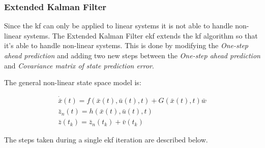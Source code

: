 \subsubsection{Extended Kalman Filter}
Since the \gls{kf} can only be applied to linear systems it is not able to handle non-linear systems. The Extended Kalman Filter {\gls{ekf}} extends the \gls{kf} algorithm so that it's able to handle non-linear systems. This is done by modifying the \textit{One-step ahead prediction} and adding two new steps between the \textit{One-step ahead prediction} and \textit{Covariance matrix of state prediction error}. 

The general non-linear state space model is:

\begin{equation}
    \begin{array}{l}
        \dot{\bar x}\left( t \right) = f\left( {\bar x\left( t \right),\bar u\left( t \right),t} \right) + G\left( {\bar x\left( t \right),t} \right)\bar w\\
        {{\bar z}_n}\left( t \right) = h\left( {\bar x\left( t \right),\bar u\left( t \right),t} \right)\\
        \bar z\left( {{t_k}} \right) = {{\bar z}_n}\left( {{t_k}} \right) + \bar v\left( {{t_k}} \right)
        \end{array}
    \label{eq:ekf_form}
\end{equation}

The steps taken during a single \gls{ekf} iteration are described below.


